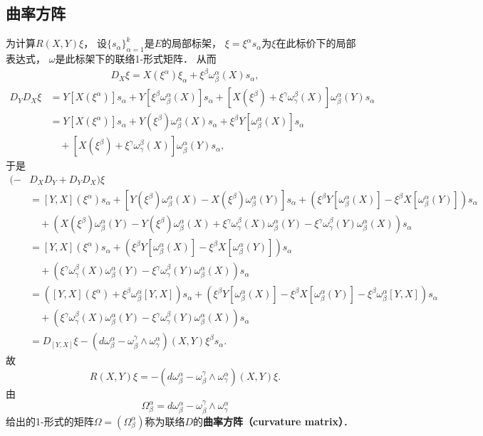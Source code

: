 \subsection{曲率方阵}
为计算$R(X,Y)\xi$， 设$\{s_\alpha\}_{\alpha=1}^k$是$E$的局部标架， $\xi=\xi^\alpha s_\alpha$为$\xi$在此标价下的局部表达式， $\omega$是此标架下的联络1-形式矩阵． 从而
$$
\begin{aligned}
D_X\xi=X(\xi^\alpha)\xi_\alpha+\xi^\beta\omega_\beta^\alpha(X) s_\alpha,
\end{aligned}
$$
$$
\begin{aligned}
D_YD_X\xi&=Y[X(\xi^\alpha)]s_\alpha+Y[\xi^\beta\omega_\beta^\alpha(X)] s_\alpha
+[X(\xi^\beta)+\xi^\gamma\omega_\gamma^\beta(X)]\omega_\beta^\alpha(Y) s_\alpha \\
&=Y[X(\xi^\alpha)]s_\alpha+Y(\xi^\beta)\omega_\beta^\alpha(X)s_\alpha+\xi^\beta Y[\omega_\beta^\alpha(X)]s_\alpha\\
&\quad+[X(\xi^\beta)+\xi^\gamma\omega_\gamma^\beta(X)]\omega_\beta^\alpha(Y) s_\alpha ,
\end{aligned}
$$
于是
$$
\begin{aligned}
(-&D_XD_Y+D_YD_X)\xi\\
&=[Y,X](\xi^\alpha)s_\alpha
+[Y(\xi^\beta)\omega_\beta^\alpha(X)-X(\xi^\beta)\omega_\beta^\alpha(Y)]s_\alpha+\left(\xi^\beta Y[\omega_\beta^\alpha(X)]-\xi^\beta X[\omega_\beta^\alpha(Y)]\right)s_\alpha\\
&\quad+\left(X(\xi^\beta)\omega_\beta^\alpha(Y)-Y(\xi^\beta)\omega_\beta^\alpha(X)+\xi^\gamma\omega_\gamma^\beta(X)\omega_\beta^\alpha(Y)-\xi^\gamma\omega_\gamma^\beta(Y)\omega_\beta^\alpha(X) \right)s_\alpha\\
&=[Y,X](\xi^\alpha)s_\alpha+\left(\xi^\beta Y[\omega_\beta^\alpha(X)]-\xi^\beta X[\omega_\beta^\alpha(Y)]\right)s_\alpha\\
&\quad+\left(\xi^\gamma\omega_\gamma^\beta(X)\omega_\beta^\alpha(Y)-\xi^\gamma\omega_\gamma^\beta(Y)\omega_\beta^\alpha(X) \right)s_\alpha\\
&=\left([Y,X](\xi^\alpha)+\xi^\beta\omega_\beta^\alpha[Y,X]\right)s_\alpha
+\left(\xi^\beta Y[\omega_\beta^\alpha(X)]-\xi^\beta X[\omega_\beta^\alpha(Y)]-\xi^\beta\omega_\beta^\alpha[Y,X]\right)s_\alpha\\
&\quad+\left(\xi^\gamma\omega_\gamma^\beta(X)\omega_\beta^\alpha(Y)-\xi^\gamma\omega_\gamma^\beta(Y)\omega_\beta^\alpha(X) \right)s_\alpha\\
&=D_{[Y,X]}\xi-(d\omega_\beta^\alpha-\omega_\beta^\gamma\wedge\omega_\gamma^\alpha)(X,Y)\xi^\beta s_\alpha.
\end{aligned}
$$
故
$$
R(X,Y)\xi=-(d\omega_\beta^\alpha-\omega_\beta^\gamma\wedge\omega_\gamma^\alpha)(X,Y)\xi.
$$
由
$$
\Omega_\beta^\alpha=d\omega_\beta^\alpha-\omega_\beta^\gamma\wedge\omega_\gamma^\alpha
$$
给出的1-形式的矩阵$\Omega=(\Omega_\beta^\alpha)$称为联络$D$的\textbf{曲率方阵（curvature matrix）}． 

